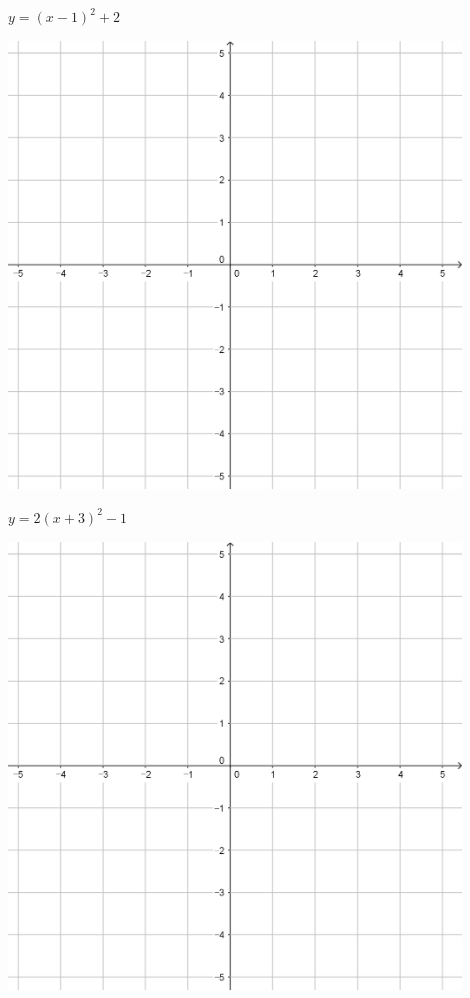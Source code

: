 \documentclass{oblivoir}
\begin{document}
\clearpage
\begin{minipage}{0.45\textwidth}\centering
\(y=(x-1)^2+2\)
\par\bigskip\includegraphics[width=0.9\textwidth]{55}
\end{minipage}
\begin{minipage}{0.45\textwidth}\centering
\(y=2(x+3)^2-1\)
\par\bigskip\includegraphics[width=0.9\textwidth]{55}
\end{minipage}\bigskip\bigskip\par
\end{document}
